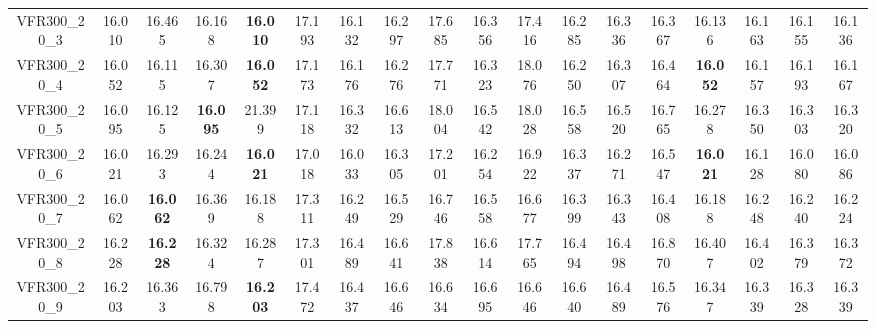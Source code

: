 \begin{tabular}{cc|ccc|ccccccccccccc}
VFR300\_20\_3      & 16.010           & 16.465           & 16.168           & {\bf 16.010}     & 17.193           & 16.132           & 16.297           & 17.685           & 16.356           & 17.416           & 16.285           & 16.336           & 16.367           & 16.136           & 16.163           & 16.155           & 16.136          \\ 
VFR300\_20\_4      & 16.052           & 16.115           & 16.307           & {\bf 16.052}     & 17.173           & 16.176           & 16.276           & 17.771           & 16.323           & 18.076           & 16.250           & 16.307           & 16.464           & {\bf 16.052}     & 16.157           & 16.193           & 16.167          \\ 
VFR300\_20\_5      & 16.095           & 16.125           & {\bf 16.095}     & 21.399           & 17.118           & 16.332           & 16.613           & 18.004           & 16.542           & 18.028           & 16.558           & 16.520           & 16.765           & 16.278           & 16.350           & 16.303           & 16.320          \\ 
VFR300\_20\_6      & 16.021           & 16.293           & 16.244           & {\bf 16.021}     & 17.018           & 16.033           & 16.305           & 17.201           & 16.254           & 16.922           & 16.337           & 16.271           & 16.547           & {\bf 16.021}     & 16.128           & 16.080           & 16.086          \\ 
VFR300\_20\_7      & 16.062           & {\bf 16.062}     & 16.369           & 16.188           & 17.311           & 16.249           & 16.529           & 16.746           & 16.558           & 16.677           & 16.399           & 16.343           & 16.408           & 16.188           & 16.248           & 16.240           & 16.224          \\ 
VFR300\_20\_8      & 16.228           & {\bf 16.228}     & 16.324           & 16.287           & 17.301           & 16.489           & 16.641           & 17.838           & 16.614           & 17.765           & 16.494           & 16.498           & 16.870           & 16.407           & 16.402           & 16.379           & 16.372          \\ 
VFR300\_20\_9      & 16.203           & 16.363           & 16.798           & {\bf 16.203}     & 17.472           & 16.437           & 16.646           & 16.634           & 16.695           & 16.646           & 16.640           & 16.489           & 16.576           & 16.347           & 16.339           & 16.328           & 16.339          \\ 

\end{tabular}
